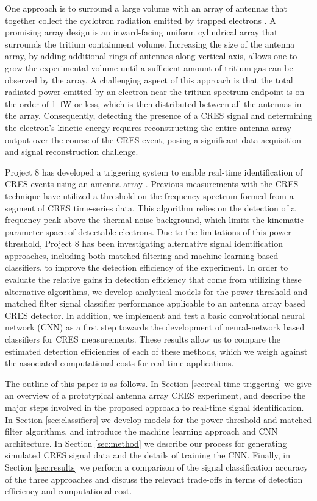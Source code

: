 One approach is to surround a large volume with an array of antennas that together collect the cyclotron radiation emitted by trapped electrons \cite{p8snowmass2022, p8PanicProc}. A promising array design is an inward-facing uniform cylindrical array that surrounds the tritium containment volume. Increasing the size of the antenna array, by adding additional rings of antennas along vertical axis, allows one to grow the experimental volume until a sufficient amount of tritium gas can be observed by the array. A challenging aspect of this approach is that the total radiated power emitted by an electron near the tritium spectrum endpoint is on the order of 1~fW or less, which is then distributed between all the antennas in the array. Consequently, detecting the presence of a CRES signal and determining the electron's kinetic energy requires reconstructing the entire antenna array output over the course of the CRES event, posing a significant data acquisition and signal reconstruction challenge.

Project 8 has developed a triggering system to enable real-time identification of CRES events using an antenna array \cite{p8daqIII}. Previous measurements with the CRES technique have utilized a threshold on the frequency spectrum formed from a segment of CRES time-series data. This algorithm relies on the detection of a frequency peak above the thermal noise background, which limits the kinematic parameter space of detectable electrons. Due to the limitations of this power threshold, Project 8 has been investigating alternative signal identification approaches, including both matched filtering and machine learning based classifiers, to improve the detection efficiency of the experiment. In order to evaluate the relative gains in detection efficiency that come from utilizing these alternative algorithms, we develop analytical models for the power threshold and matched filter signal classifier performance applicable to an antenna array based CRES detector. In addition, we implement and test a basic convolutional neural network (CNN) as a first step towards the development of neural-network based classifiers for CRES measurements. These results allow us to compare the estimated detection efficiencies of each of these methods, which we weigh against the associated computational costs for real-time applications.

The outline of this paper is as follows. In Section \ref{sec:real-time-triggering} we give an overview of a prototypical antenna array CRES experiment, and describe the major steps involved in the proposed approach to real-time signal identification. In Section \ref{sec:classifiers} we develop models for the power threshold and matched filter algorithms, and introduce the machine learning approach and CNN architecture. In Section \ref{sec:method} we describe our process for generating simulated CRES signal data and the details of training the CNN. Finally, in Section \ref{sec:results} we perform a comparison of the signal classification accuracy of the three approaches and discuss the relevant trade-offs in terms of detection efficiency and computational cost.

